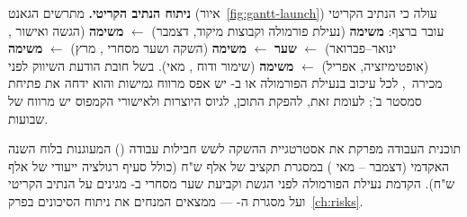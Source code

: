 \textbf{ניתוח הנתיב הקריטי.} מתרשים הגאנט (איור~\ref{fig:gantt-launch}) עולה כי
הנתיב הקריטי עובר ברצף: \textbf{משימה } (נעילת פורמולה וקבוצות מיקוד,
דצמבר) $\leftarrow$ \textbf{משימה } (הגשה ואישור , ינואר--פברואר)
$\leftarrow$ \textbf{שער } $\leftarrow$ \textbf{משימה } (השקה
ושער מסחרי , מרץ) $\leftarrow$ \textbf{משימה } (אופטימיזציה,
אפריל) $\leftarrow$ \textbf{משימה } (שימור ודוח , מאי). בשל
חובת הודעת השיווק לפני מכירה~\cite{ita2023israelcosmetics}, לכל עיכוב בנעילת
הפורמולה או ב- יש אפס מרווח גמישות והוא ידחה את פתיחת סמסטר ב';
לעומת זאת, להפקת התוכן, לגיוס היוצרות ולאישורי הקמפוס יש מרווח של 
שבועות.

\begin{keymessage}
תוכנית העבודה מפרקת את אסטרטגיית ההשקה לשש חבילות עבודה ()
המעוגנות בלוח השנה האקדמי (דצמבר  -- מאי ) במסגרת תקציב
של  אלף ש"ח (כולל סעיף רגולציה ייעודי של  אלף ש"ח). הקדמת
נעילת הפורמולה לפני הגשת  וקביעת שער מסחרי ב- מגינים על
הנתיב הקריטי ועל מסגרת ה- --- ממצאים המנחים את ניתוח הסיכונים
בפרק~\ref{ch:risks}.
\end{keymessage}
